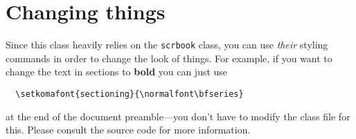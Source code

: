 \section{Changing things}

Since this class heavily relies on the \verb|scrbook| class, you can use
\emph{their} styling commands in order to change the look of things. For
example, if you want to change the text in sections to \textbf{bold} you
can just use
%
\begin{verbatim}
  \setkomafont{sectioning}{\normalfont\bfseries}
\end{verbatim}
%
at the end of the document preamble---you don't have to modify the class
file for this. Please consult the source code for more information.
